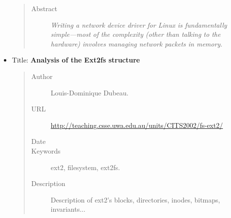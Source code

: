 \documentclass[a4paper,8pt,english]{sphinxmanual}
\begin{document}
\begin{itemize}
\begin{quote}
\begin{description}
\item[{Abstract}] \leavevmode
\emph{Writing a network device driver for Linux is fundamentally
simple---most of the complexity (other than talking to the
hardware) involves managing network packets in memory}.

\end{description}\end{quote}

\item {} 
Title: \textbf{Analysis of the Ext2fs structure}
\begin{quote}\begin{description}
\item[{Author}] \leavevmode
Louis-Dominique Dubeau.

\item[{URL}] \leavevmode
\href{http://teaching.csse.uwa.edu.au/units/CITS2002/fs-ext2/}{http://teaching.csse.uwa.edu.au/units/CITS2002/fs-ext2/}

\item[{Date}] 

\item[{Keywords}] \leavevmode
ext2, filesystem, ext2fs.

\item[{Description}] \leavevmode
Description of ext2's blocks, directories, inodes,
bitmaps, invariants...

\end{description}\end{quote}

\end{itemize}
\end{document}
